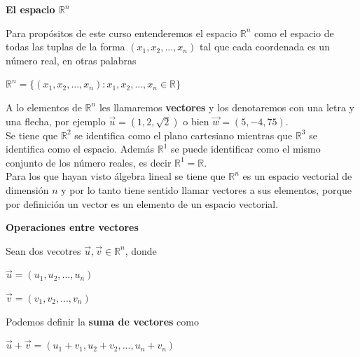 \documentclass{article}
\theoremstyle{plain}
\theoremstyle{definition}
\begin{document}
\begin{center}
\textbf{\large{El espacio $\mathbb{R}^n$}} \\
\end{center}

Para propósitos de este curso entenderemos el espacio $\mathbb{R}^n$ como el espacio de todas las tuplas de la forma $(x_1,x_2,..., x_n)$ tal que cada coordenada es un número real, en otras palabras

\begin{center}
$\mathbb{R}^n = \lbrace (x_1,x_2,..., x_n) : x_1,x_2,... ,x_n \in \mathbb{R} \rbrace$
\end{center}

A lo elementos de $\mathbb{R}^n$ les llamaremos \textbf{vectores} y los denotaremos con una letra y una flecha, por ejemplo $\overrightarrow{u} = (1,2,\sqrt{2})$ o bien $\overrightarrow{w} = (5,-4,75)$. \\

Se tiene que $\mathbb{R}^2$ se identifica como el plano cartesiano mientras que $ \mathbb{R}^3$ se identifica como el espacio. Además $\mathbb{R}^1$ se puede identificar como el mismo conjunto de los número reales, es decir $\mathbb{R}^1 =\mathbb{R}$. \\



Para los que hayan visto álgebra lineal se tiene que $\mathbb{R}^n$ es un espacio vectorial de dimensión $n$ y por lo tanto tiene sentido llamar vectores a sus elementos, porque por definición un vector es un elemento de un espacio vectorial. \\



\begin{center}
\textbf{\large{Operaciones entre vectores}} \\
\end{center}


Sean dos vecotres $\overrightarrow{u},\overrightarrow{v} \in \mathbb{R}^n$, donde

\begin{center}
$\overrightarrow{u} = (u_1,u_2,... ,u_n)$
\end{center}

\begin{center}
$\overrightarrow{v} = (v_1,v_2,... ,v_n)$
\end{center}


Podemos definir la \textbf{suma de vectores } como


\begin{center}
$\overrightarrow{u}+ \overrightarrow{v} = (u_1+v_1,u_2+v_2,... ,u_n+v_n) $
\end{center}
\end{document}
